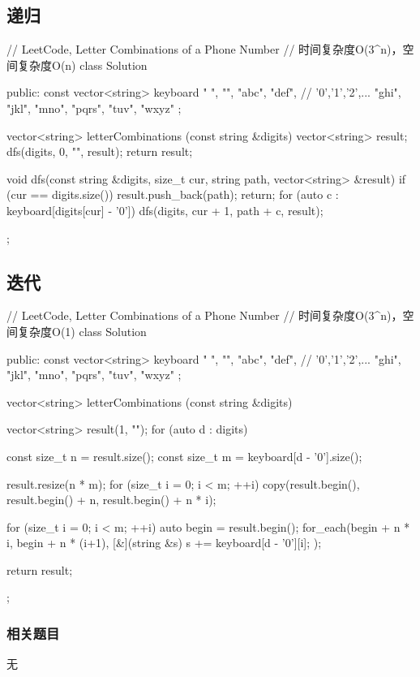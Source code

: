 \subsection{递归}
\begin{Code}
// LeetCode, Letter Combinations of a Phone Number
// 时间复杂度O(3^n)，空间复杂度O(n)
class Solution {
public:
    const vector<string> keyboard { " ", "", "abc", "def", // '0','1','2',...
            "ghi", "jkl", "mno", "pqrs", "tuv", "wxyz" };

    vector<string> letterCombinations (const string &digits) {
        vector<string> result;
        dfs(digits, 0, "", result);
        return result;
    }

    void dfs(const string &digits, size_t cur, string path,
            vector<string> &result) {
        if (cur == digits.size()) {
            result.push_back(path);
            return;
        }
        for (auto c : keyboard[digits[cur] - '0']) {
            dfs(digits, cur + 1, path + c, result);
        }
    }
};
\end{Code}


\subsection{迭代}
\begin{Code}
// LeetCode, Letter Combinations of a Phone Number
// 时间复杂度O(3^n)，空间复杂度O(1)
class Solution {
public:
    const vector<string> keyboard { " ", "", "abc", "def", // '0','1','2',...
            "ghi", "jkl", "mno", "pqrs", "tuv", "wxyz" };

    vector<string> letterCombinations (const string &digits) {
        vector<string> result(1, "");
        for (auto d : digits) {
            const size_t n = result.size();
            const size_t m = keyboard[d - '0'].size();

            result.resize(n * m);
            for (size_t i = 0; i < m; ++i)
                copy(result.begin(), result.begin() + n, result.begin() + n * i);

            for (size_t i = 0; i < m; ++i) {
                auto begin = result.begin();
                for_each(begin + n * i, begin + n * (i+1), [&](string &s) {
                    s += keyboard[d - '0'][i];
                });
            }
        }
        return result;
    }
};
\end{Code}


\subsubsection{相关题目}
\begindot
\item 无
\myenddot
